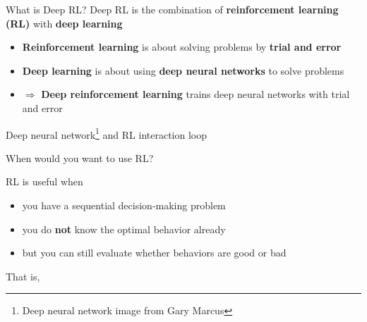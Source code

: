 
\begin{frame}{What is Deep RL?}
Deep RL is the combination of \textbf{reinforcement learning (RL)} with \textbf{deep learning}

\begin{itemize}
\item \textbf{Reinforcement learning} is about solving problems by \textbf{trial and error}
\item \textbf{Deep learning} is about using \textbf{deep neural networks} to solve problems
\item $\Longrightarrow$ \textbf{Deep reinforcement learning} trains deep neural networks with trial and error
\end{itemize}

\begin{center}
Deep neural network\footnote{Deep neural network image from Gary Marcus} and RL interaction loop
\end{center}
\end{frame}

\begin{frame}{When would you want to use RL?}

RL is useful when
%
\begin{itemize}
\item you have a sequential decision-making problem
\item you do \textbf{not} know the optimal behavior already\footnotemark[1]
\item but you can still evaluate whether behaviors are good or bad
\end{itemize}

\vspace{3em}

That is, 

\begin{center}
\end{center}


\end{frame}

